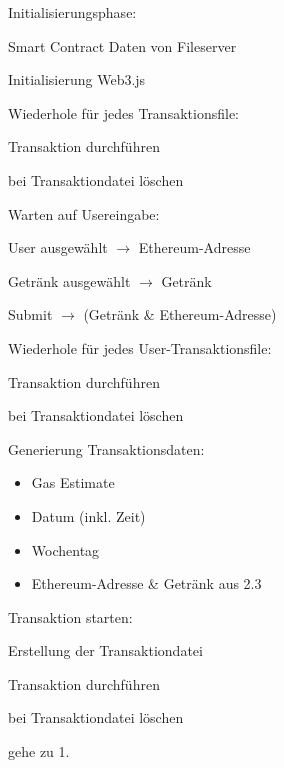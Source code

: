\begin{legal}
	\item Initialisierungsphase:
	\begin{legal}
		\item {} Smart Contract Daten von Fileserver
		\item Initialisierung Web3.js
		\item Wiederhole für jedes Transaktionsfile:
		\begin{legal}
			\item Transaktion durchführen
			\item bei  Transaktiondatei löschen
		\end{legal}
	\end{legal}
	\item Warten auf Usereingabe:
	\begin{legal}
		\item User ausgewählt $\rightarrow$ Ethereum-Adresse
		\item Getränk ausgewählt $\rightarrow$ Getränk
		\item Submit $\rightarrow$ (Getränk \& Ethereum-Adresse)
	\end{legal}
	\item Wiederhole für jedes User-Transaktionsfile:
		\begin{legal}
			\item Transaktion durchführen
			\item bei  Transaktiondatei löschen
		\end{legal}
	\item Generierung Transaktionsdaten:
	\begin{itemize}
		\item Gas Estimate
		\item Datum (inkl. Zeit)
		\item Wochentag
		\item Ethereum-Adresse \& Getränk aus 2.3
	\end{itemize}
	\item Transaktion starten:
	\begin{legal}
		\item Erstellung der Transaktiondatei
		\item Transaktion durchführen
		\item bei  Transaktiondatei löschen
		\item gehe zu 1.
	\end{legal} 	
\end{legal}

